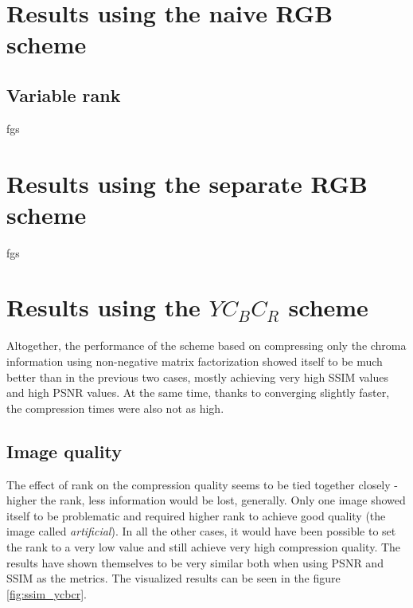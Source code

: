 \documentclass[thesis=M,english]{FITthesis}[2012/10/20]
\begin{document}
\section{Results using the naive RGB scheme}
\subsection{Variable rank}
fgs

\section{Results using the separate RGB scheme}
fgs

\section{Results using the $YC_BC_R$ scheme}
Altogether, the performance of the scheme based on compressing only the chroma
information using non-negative matrix factorization showed itself to be much
better than in the previous two cases, mostly achieving very high SSIM values
and high PSNR values. At the same time, thanks to converging slightly faster,
the compression times were also not as high.
\\

\subsection{Image quality}
The effect of rank on the compression quality seems to be tied together closely
- higher the rank, less information would be lost, generally. Only one image
showed itself to be problematic and required higher rank to achieve good quality (the image called
\emph{artificial}). In all the other cases, it would have been possible to set the
rank to a very low value and still achieve very high compression quality. The results have
shown themselves to be very similar both when using PSNR and SSIM as the metrics. The
visualized results can be seen in the figure \ref{fig:ssim_ycbcr}.
\\
\end{document}
